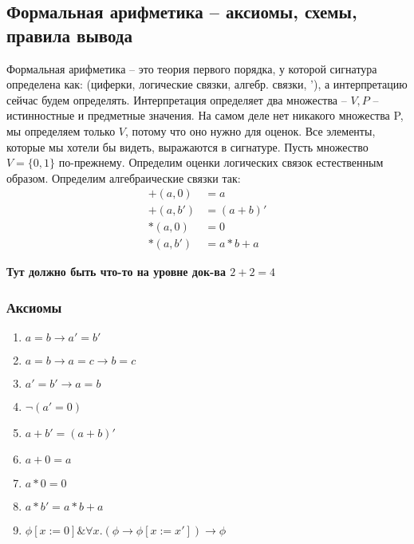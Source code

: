 \subsection{Формальная арифметика -- аксиомы, схемы, правила вывода}
\label{sec-9-3}
Формальная арифметика -- это теория первого порядка, у которой
сигнатура определена как: (циферки, логические связки, алгебр.
связки, '), а интерпретацию сейчас будем определять.
Интерпретация определяет два множества -- $V, P$ -- истинностные и
предметные значения. На самом деле нет никакого множества P,
мы определяем только $V$, потому что оно нужно для оценок. Все
элементы, которые мы хотели бы видеть, выражаются в сигнатуре.
Пусть множество $V = \lbrace 0, 1 \rbrace$ по-прежнему.
Определим оценки логических связок естественным образом.
Определим алгебраические связки так:
\begin{align*}
    +(a, 0 ) &= a \\
    +(a, b') &= (a + b)' \\
    *(a, 0 ) &= 0 \\
    *(a, b') &= a * b + a
\end{align*}

\textbf{Тут должно быть что-то на уровне док-ва $2+2=4$}
\subsubsection{Аксиомы}
\label{sec-9-3-1}
\begin{enumerate}
\item $a = b \to a' = b'$
\item $a = b \to a = c \to b = c$
\item $a' = b' \to a = b$
\item $\lnot (a' = 0)$
\item $a + b' = (a + b)'$
\item $a + 0 = a$
\item $a * 0 = 0$
\item $a * b' = a * b + a$
\item $\phi[x:=0] \& \forall x.(\phi \to \phi[x:=x']) \to \phi$
\end{enumerate}
